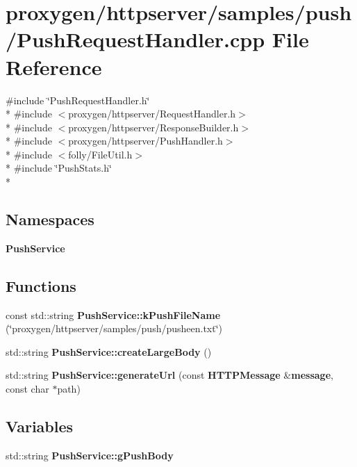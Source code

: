 \section{proxygen/httpserver/samples/push/\+Push\+Request\+Handler.cpp File Reference}
\label{PushRequestHandler_8cpp}
{\ttfamily \#include \char`\"{}Push\+Request\+Handler.\+h\char`\"{}}\\*
{\ttfamily \#include $<$proxygen/httpserver/\+Request\+Handler.\+h$>$}\\*
{\ttfamily \#include $<$proxygen/httpserver/\+Response\+Builder.\+h$>$}\\*
{\ttfamily \#include $<$proxygen/httpserver/\+Push\+Handler.\+h$>$}\\*
{\ttfamily \#include $<$folly/\+File\+Util.\+h$>$}\\*
{\ttfamily \#include \char`\"{}Push\+Stats.\+h\char`\"{}}\\*
\subsection*{Namespaces}
\begin{DoxyCompactItemize}
\item 
 {\bf Push\+Service}
\end{DoxyCompactItemize}
\subsection*{Functions}
\begin{DoxyCompactItemize}
\item 
const std\+::string {\bf Push\+Service\+::k\+Push\+File\+Name} (\char`\"{}proxygen/httpserver/samples/push/pusheen.\+txt\char`\"{})
\item 
std\+::string {\bf Push\+Service\+::create\+Large\+Body} ()
\item 
std\+::string {\bf Push\+Service\+::generate\+Url} (const {\bf H\+T\+T\+P\+Message} \&{\bf message}, const char $\ast$path)
\end{DoxyCompactItemize}
\subsection*{Variables}
\begin{DoxyCompactItemize}
\item 
std\+::string {\bf Push\+Service\+::g\+Push\+Body}
\end{DoxyCompactItemize}
